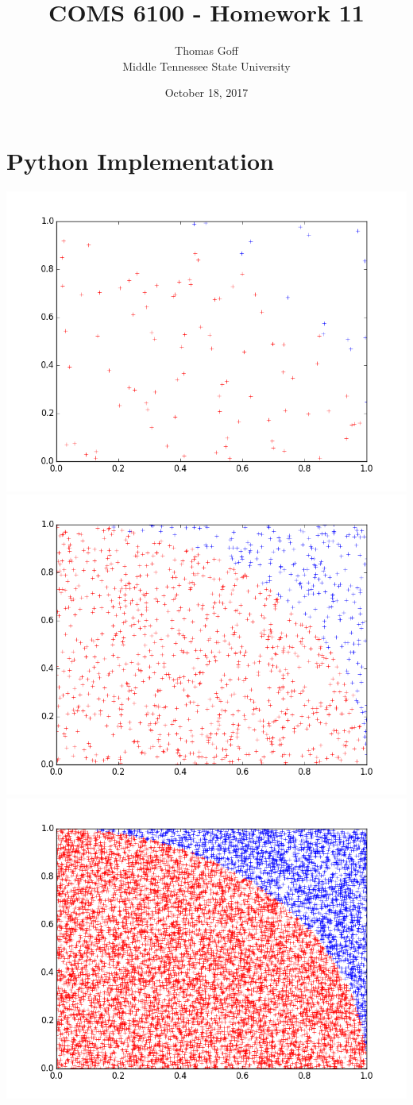 \documentclass[11pt]{article}
\title{\textbf{COMS 6100 - Homework 11}}
\date{October 18, 2017}
\author{Thomas Goff\\ Middle Tennessee State University}
\begin{document}
\maketitle
\section{Python Implementation}

\includegraphics{plot100.png}
\includegraphics{plot1000.png}
\includegraphics{plot10000.png}
\end{document}
